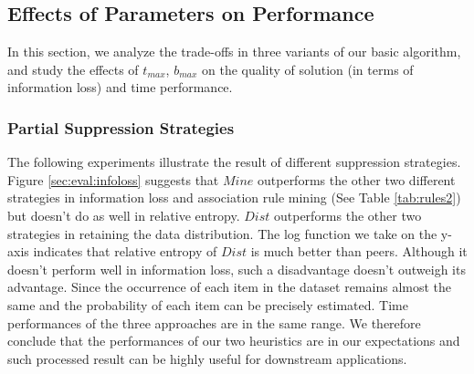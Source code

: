 \subsection{Effects of Parameters on Performance}\label{sec:eval:effect}
In this section, we analyze the trade-offs in three variants of our basic
algorithm, and study the effects of $t_{max}$, $b_{max}$ on the
quality of solution (in terms of information loss) and time performance.

\subsubsection{Partial Suppression Strategies}\label{sec:eval:partialsuppression}
The following experiments illustrate the result of different suppression
strategies. Figure \ref{sec:eval:infoloss} suggests that $Mine$ outperforms
the other two different strategies in information loss and association rule
mining (See Table \ref{tab:rules2}) but doesn't do as well in relative
entropy. $Dist$ outperforms the other two strategies in retaining the data
distribution. The log function we take on the y-axis indicates that relative
entropy of $Dist$ is much better than peers. Although it doesn't perform well
in information loss, such a disadvantage doesn't outweigh its advantage.
Since the occurrence of each item in the dataset remains almost the same and
the probability of each item can be precisely estimated. Time performances of
the three approaches are in the same range. We therefore conclude that the
performances of our two heuristics are in our expectations and such processed
result can be highly useful for downstream applications.

